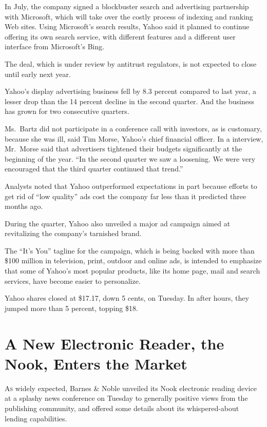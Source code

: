 ﻿\documentclass[12pt]{article}
\begin{document}
In July, the company signed a blockbuster search and advertising partnership with Microsoft, which
will take over the costly process of indexing and ranking Web sites. Using Microsoft's search
results, Yahoo said it planned to continue offering its own search service, with different features
and a different user interface from Microsoft's Bing.

The deal, which is under review by antitrust regulators, is not expected to close until early next
year.

Yahoo's display advertising business fell by 8.3 percent compared to last year, a lesser drop than
the 14 percent decline in the second quarter. And the business has grown for two consecutive
quarters.

Ms.~Bartz did not participate in a conference call with investors, as is customary, because she was
ill, said Tim Morse, Yahoo's chief financial officer. In a interview, Mr.~Morse said that
advertisers tightened their budgets significantly at the beginning of the year. ``In the second
quarter we saw a loosening. We were very encouraged that the third quarter continued that trend.''

Analysts noted that Yahoo outperformed expectations in part because efforts to get rid of ``low
quality'' ads cost the company far less than it predicted three months ago.

During the quarter, Yahoo also unveiled a major ad campaign aimed at revitalizing the company's
tarnished brand.

The ``It's You'' tagline for the campaign, which is being backed with more than \$100 million in
television, print, outdoor and online ads, is intended to emphasize that some of Yahoo's most
popular products, like its home page, mail and search services, have become easier to personalize.

Yahoo shares closed at \$17.17, down 5 cents, on Tuesday. In after hours, they jumped more than 5
percent, topping \$18.

\section{A New Electronic Reader, the Nook, Enters the Market}

\lettrine{A}{s} widely expected, Barnes \& Noble unveiled its Nook
electronic reading device at a splashy news conference on Tuesday to generally positive views from
the publishing community, and offered some details about its whispered-about lending capabilities.
\end{document}
